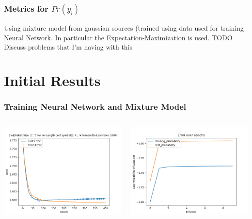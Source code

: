\documentclass[10pt,tgadventor, onlymath]{beamer}
\begin{document}
\begin{frame}
	\frametitle{Metrics for $Pr(y_{\mathrm{i}})$}
	Using mixture model from gaussian sources (trained using data used for training Neural Network.
	In particular the Expectation-Maximization is used.
	TODO Discuss problems that I'm having with this
\end{frame}



\section{Initial Results}

\begin{frame}
\frametitle{Training Neural Network and Mixture Model}
\begin{columns}
\begin{column}{0.5\linewidth}
	\includegraphics[width=\textwidth]{nn_training}
\end{column}
\begin{column}{0.5\linewidth}
	\includegraphics[width=\textwidth]{mm_training}
\end{column}
\end{columns}
\end{frame}
\end{document}
